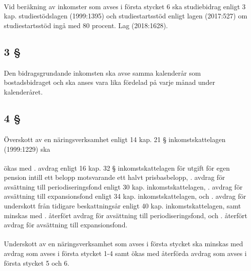 \documentclass[a4paper,notitlepage,openany,10pt]{book}
\begin{document}
\paragraph*{}
Vid beräkning av inkomster som avses i första stycket 6 ska studiebidrag enligt 3 kap. studiestödslagen (1999:1395) och studiestartsstöd enligt lagen (2017:527) om studiestartsstöd ingå med 80 procent.
Lag (2018:1628).
\subsection*{3 §}
\paragraph*{}
Den bidragsgrundande inkomsten ska avse samma kalenderår som bostadsbidraget och ska anses vara lika fördelad på varje månad under kalenderåret.
\subsection*{4 §}
\paragraph*{}
Överskott av en näringsverksamhet enligt 14 kap. 21 § inkomstskattelagen (1999:1229) ska
\paragraph*{}
ökas med
. avdrag enligt 16 kap. 32 § inkomstskattelagen för utgift för egen pension intill ett belopp motsvarande ett halvt prisbasbelopp,
. avdrag för avsättning till periodiseringsfond enligt 30 kap. inkomstskattelagen,
. avdrag för avsättning till expansionsfond enligt 34 kap.
inkomstskattelagen, och
. avdrag för underskott från tidigare beskattningsår enligt 40 kap. inkomstskattelagen,
samt minskas med
. återfört avdrag för avsättning till periodiseringsfond, och
. återfört avdrag för avsättning till expansionsfond.
\paragraph*{}
Underskott av en näringsverksamhet som avses i första stycket ska minskas med avdrag som avses i första stycket 1-4 samt ökas med återförda avdrag som avses i första stycket 5 och 6.
\end{document}
